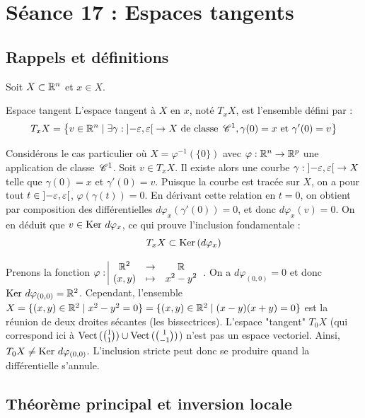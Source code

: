 \section{Séance 17 : Espaces tangents}

\subsection{Rappels et définitions}

Soit $X \subset \mathbb{R}^n$ et $x \in X$.

\begin{definition}{Espace tangent}{}
    L'espace tangent à $X$ en $x$, noté $T_x X$, est l'ensemble défini par :
    \[ T_x X = \left\{ v \in \mathbb{R}^n \mid \exists \gamma : \left]-\varepsilon, \varepsilon\right[ \to X \text{ de classe } \,\mathscr C^{1}, \gamma(0)=x \text{ et } \gamma'(0)=v \right\} \]
\end{definition}


\begin{remarque}
    Considérons le cas particulier où $X = \varphi^{-1}(\{0\})$ avec $\varphi : \mathbb{R}^n \to \mathbb{R}^p$ une application de classe $\,\mathscr C^{1}$.
    Soit $v \in T_x X$. Il existe alors une courbe $\gamma : \left]-\varepsilon, \varepsilon\right[ \to X$ telle que $\gamma(0)=x$ et $\gamma'(0)=v$.
    Puisque la courbe est tracée sur $X$, on a pour tout $t \in \left]-\varepsilon, \varepsilon\right[$, $\varphi(\gamma(t)) = 0$.
    En dérivant cette relation en $t=0$, on obtient par composition des différentielles $d\varphi_x(\gamma'(0)) = 0$, et donc $d\varphi_x(v) = 0$.
    On en déduit que $v \in \operatorname{Ker} \, d\varphi_x$, ce qui prouve l'inclusion fondamentale :
    \[ T_x X \subset \operatorname{Ker} \,(d\varphi_x) \]
\end{remarque}

\begin{exemple}
    Prenons la fonction $\varphi: \space \begin{array}{|ccc} \displaystyle \mathbb{R}^2 & \to & \displaystyle \mathbb{R} \\ \displaystyle (x,y) & \mapsto & \displaystyle x^2 - y^2 \end{array}$.
    On a $d\varphi_{(0,0)} = 0$ et donc $\operatorname{Ker} \, d\varphi_{(0,0)} = \mathbb{R}^2$.
    Cependant, l'ensemble $X = \{(x,y) \in \mathbb{R}^2 \mid x^2 - y^2 = 0\} = \{(x,y) \in \mathbb{R}^2 \mid (x-y)(x+y) = 0\}$ est la réunion de deux droites sécantes (les bissectrices).
    L'espace "tangent" $T_0 X$ (qui correspond ici à $\operatorname{Vect} \,(\binom{1}{1}) \cup \operatorname{Vect} \,(\binom{1}{-1})$) n'est pas un espace vectoriel. Ainsi, $T_0 X \neq \operatorname{Ker} \, d\varphi_{(0,0)}$. L'inclusion stricte peut donc se produire quand la différentielle s'annule.
\end{exemple}

\subsection{Théorème principal et inversion locale}

